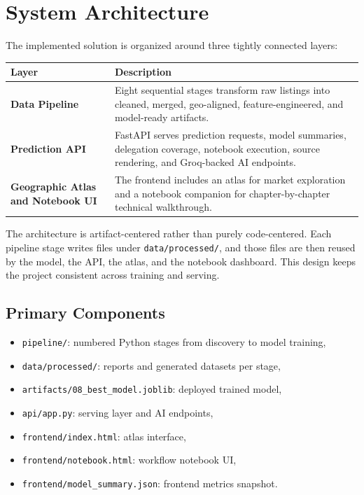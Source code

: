 \documentclass[11pt,a4paper]{article}
\newcommand{\code}[1]{\texttt{#1}}
\begin{document}
\section{System Architecture}

The implemented solution is organized around three tightly connected layers:

\begin{center}
\begin{tabularx}{\textwidth}{>{\bfseries}p{}X}
\toprule
Layer & Description \\
\midrule
Data Pipeline & Eight sequential stages transform raw listings into cleaned, merged, geo-aligned, feature-engineered, and model-ready artifacts. \\
Prediction API & FastAPI serves prediction requests, model summaries, delegation coverage, notebook execution, source rendering, and Groq-backed AI endpoints. \\
Geographic Atlas and Notebook UI & The frontend includes an atlas for market exploration and a notebook companion for chapter-by-chapter technical walkthrough. \\
\bottomrule
\end{tabularx}
\end{center}

The architecture is artifact-centered rather than purely code-centered. Each pipeline stage writes files under \code{data/processed/}, and those files are then reused by the model, the API, the atlas, and the notebook dashboard. This design keeps the project consistent across training and serving.

\subsection{Primary Components}

\begin{itemize}
\item \code{pipeline/}: numbered Python stages from discovery to model training,
\item \code{data/processed/}: reports and generated datasets per stage,
\item \code{artifacts/08\_best\_model.joblib}: deployed trained model,
\item \code{api/app.py}: serving layer and AI endpoints,
\item \code{frontend/index.html}: atlas interface,
\item \code{frontend/notebook.html}: workflow notebook UI,
\item \code{frontend/model\_summary.json}: frontend metrics snapshot.
\end{itemize}
\end{document}
